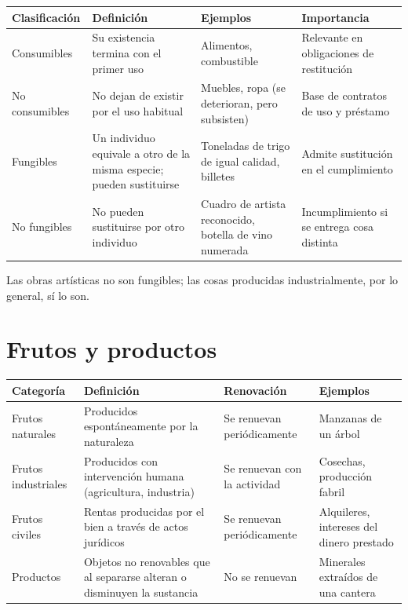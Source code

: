 \documentclass[12pt,oneside]{book}
\newenvironment{tabla}{%
    \par\medskip\begingroup\small\renewcommand{\arraystretch}{1.3}\noindent\ignorespaces
}{%
    \par\endgroup\medskip
}
\begin{document}
\begin{tabla}
\begin{tabularx}{\textwidth}{B{3.0cm}YYY}
\toprule
Clasificación & \textbf{Definición} & \textbf{Ejemplos} & \textbf{Importancia} \\
\midrule
Consumibles & Su existencia termina con el primer uso & Alimentos, combustible & Relevante en obligaciones de restitución \\
No consumibles & No dejan de existir por el uso habitual & Muebles, ropa (se deterioran, pero subsisten) & Base de contratos de uso y préstamo \\
Fungibles & Un individuo equivale a otro de la misma especie; pueden sustituirse & Toneladas de trigo de igual calidad, billetes & Admite sustitución en el cumplimiento \\
No fungibles & No pueden sustituirse por otro individuo & Cuadro de artista reconocido, botella de vino numerada & Incumplimiento si se entrega cosa distinta \\
\bottomrule
\end{tabularx}
\end{tabla}

Las obras artísticas no son fungibles; las cosas producidas industrialmente, por lo general, sí lo son.

\section{Frutos y productos}

\begin{tabla}
\begin{tabularx}{\textwidth}{B{3.2cm}YYY}
\toprule
Categoría & \textbf{Definición} & \textbf{Renovación} & \textbf{Ejemplos} \\
\midrule
Frutos naturales & Producidos espontáneamente por la naturaleza & Se renuevan periódicamente & Manzanas de un árbol \\
Frutos industriales & Producidos con intervención humana (agricultura, industria) & Se renuevan con la actividad & Cosechas, producción fabril \\
Frutos civiles & Rentas producidas por el bien a través de actos jurídicos & Se renuevan periódicamente & Alquileres, intereses del dinero prestado \\
Productos & Objetos no renovables que al separarse alteran o disminuyen la sustancia & No se renuevan & Minerales extraídos de una cantera \\
\bottomrule
\end{tabularx}
\end{tabla}
\end{document}

